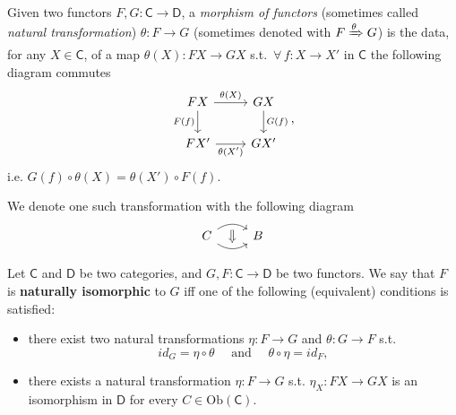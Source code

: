 \begin{defn}
	Given two functors $F,G: \mathsf{C} \to \mathsf{D}$, a {\em morphism of functors} (sometimes called \textit{natural transformation}) $\theta: F \to G$ (sometimes denoted with $F \xRightarrow{\theta} G$) 
	is the data, for any $X \in \mathsf{C}$, of a map $\theta(X): FX \to GX$ s.t. $\,\forall\, f: X \to X'$ in $\mathsf{C}$ the following diagram commutes
	\begin{equation}
	\begin{tikzcd}
		FX \arrow[r, "{\theta(X)}", rightarrow] \arrow[d, "{F(f)}"', rightarrow] & GX \arrow[d, "{G(f)}", rightarrow] \\
		FX' \arrow[r, "{\theta(X')}"', rightarrow] & GX'
	\end{tikzcd}
	,\end{equation} 
	i.e. $G(f) \circ \theta(X) = \theta(X') \circ F(f)$.

	We denote one such transformation with the following diagram
	\begin{equation}
	\begin{tikzcd}[row sep=tiny]
		C \arrow[r, ""{name=U, below}, rightarrow, bend left=35] 
		\arrow[r, ""{name=D}, rightarrow, bend right=35] &
		B
		\arrow[Rightarrow, from=U, to=D] 
	\end{tikzcd}
	\end{equation} 
\end{defn}

\begin{defn}
	Let $\mathsf{C}$ and $\mathsf{D}$ be two categories, and $G,F: \mathsf{C} \to \mathsf{D}$ be two functors.
	We say that $F$ is \textbf{naturally isomorphic} to $G$ iff one of the following (equivalent) conditions is satisfied:
	\begin{itemize}
		\item there exist two natural transformations $\eta: F \to G$ and $\theta: G \to F$ s.t.
			\begin{equation}
			id_G = \eta \circ \theta \quad \text{ and } \quad \theta \circ \eta = id_F
			,\end{equation} 
		\item there exists a natural transformation $\eta: F \to G$ s.t. $\eta_X: FX \to GX$ is an isomorphism in $\mathsf{D}$ for every $C \in \mathrm{Ob} \left(\mathsf{C}\right)$.
	\end{itemize}
\end{defn}

